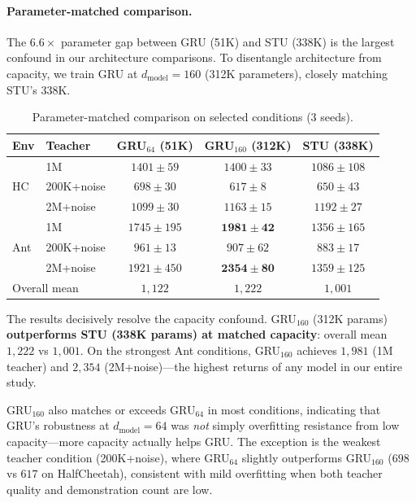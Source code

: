 \paragraph{Parameter-matched comparison.}
\label{sec:param-matched}

The $6.6\times$ parameter gap between GRU (51K) and STU (338K) is the largest confound in our architecture comparisons.
To disentangle architecture from capacity, we train GRU at $d_\text{model} = 160$ (312K parameters), closely matching STU's 338K.

\begin{table}[ht]
\centering
\caption{Parameter-matched comparison on selected conditions (3 seeds).}
\label{tab:param-matched}
\begin{tabular}{llccc}
\toprule
Env & Teacher & GRU$_{64}$ (51K) & GRU$_{160}$ (312K) & STU (338K) \\
\midrule
\multirow{3}{*}{HC} & 1M           & $1401 \pm 59$   & $1400 \pm 33$   & $1086 \pm 108$ \\
                    & 200K+noise   & $698 \pm 30$    & $617 \pm 8$     & $650 \pm 43$ \\
                    & 2M+noise     & $1099 \pm 30$   & $1163 \pm 15$   & $1192 \pm 27$ \\
\midrule
\multirow{3}{*}{Ant} & 1M          & $1745 \pm 195$  & $\mathbf{1981 \pm 42}$   & $1356 \pm 165$ \\
                     & 200K+noise  & $961 \pm 13$    & $907 \pm 62$    & $883 \pm 17$ \\
                     & 2M+noise    & $1921 \pm 450$  & $\mathbf{2354 \pm 80}$   & $1359 \pm 125$ \\
\midrule
\multicolumn{2}{l}{Overall mean}   & $1{,}122$ & $1{,}222$ & $1{,}001$ \\
\bottomrule
\end{tabular}
\end{table}

The results decisively resolve the capacity confound.
GRU$_{160}$ (312K params) \textbf{outperforms STU (338K params) at matched capacity}: overall mean $1{,}222$ vs $1{,}001$.
On the strongest Ant conditions, GRU$_{160}$ achieves $1{,}981$ (1M teacher) and $2{,}354$ (2M+noise)---the highest returns of any model in our entire study.

GRU$_{160}$ also matches or exceeds GRU$_{64}$ in most conditions, indicating that GRU's robustness at $d_\text{model}=64$ was \emph{not} simply overfitting resistance from low capacity---more capacity actually helps GRU.
The exception is the weakest teacher condition (200K+noise), where GRU$_{64}$ slightly outperforms GRU$_{160}$ ($698$ vs $617$ on HalfCheetah), consistent with mild overfitting when both teacher quality and demonstration count are low.

